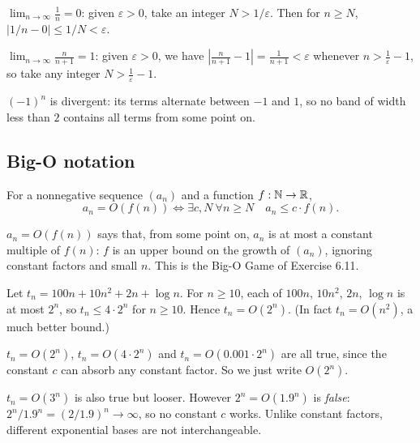 \begin{example}
$\lim_{n\to\infty} \frac1n = 0$: given $\varepsilon>0$, take an integer $N>1/\varepsilon$. Then for $n\ge N$, $|1/n-0|\le1/N<\varepsilon$.
\end{example}

\begin{example}
$\lim_{n\to\infty}\frac{n}{n+1}=1$: given $\varepsilon>0$, we have $\left|\frac{n}{n+1}-1\right| = \frac{1}{n+1} < \varepsilon$ whenever $n > \frac1\varepsilon-1$, so take any integer $N>\frac1\varepsilon-1$.
\end{example}

\begin{example}
$(-1)^n$ is divergent: its terms alternate between $-1$ and $1$, so no band of width less than $2$ contains all terms from some point on.
\end{example}

\subsection{Big-O notation}
\label{sec:6-9}

\begin{definition}[Big-O]
For a nonnegative sequence $(a_n)$ and a function $f:\mathbb{N}\to\mathbb{R}$,
\[
a_n = O(f(n)) \iff \exists c,N\ \forall n\ge N\quad a_n \le c\cdot f(n).
\]
\end{definition}

\begin{note}[Meaning]
$a_n=O(f(n))$ says that, from some point on, $a_n$ is at most a constant multiple of $f(n)$: $f$ is an upper bound on the growth of $(a_n)$, ignoring constant factors and small $n$. This is the Big-O Game of Exercise 6.11.
\end{note}

\begin{example}
Let $t_n = 100n+10n^2+2n+\log n$. For $n\ge10$, each of $100n$, $10n^2$, $2n$, $\log n$ is at most $2^n$, so $t_n \le 4\cdot2^n$ for $n\ge10$. Hence $t_n = O(2^n)$. (In fact $t_n=O(n^2)$, a much better bound.)
\end{example}

\begin{note}
$t_n=O(2^n)$, $t_n=O(4\cdot2^n)$ and $t_n=O(0.001\cdot2^n)$ are all true, since the constant $c$ can absorb any constant factor. So we just write $O(2^n)$.
\end{note}

\begin{note}
$t_n=O(3^n)$ is also true but looser. However $2^n=O(1.9^n)$ is \emph{false}: $2^n/1.9^n=(2/1.9)^n\to\infty$, so no constant $c$ works. Unlike constant factors, different exponential bases are not interchangeable.
\end{note}

